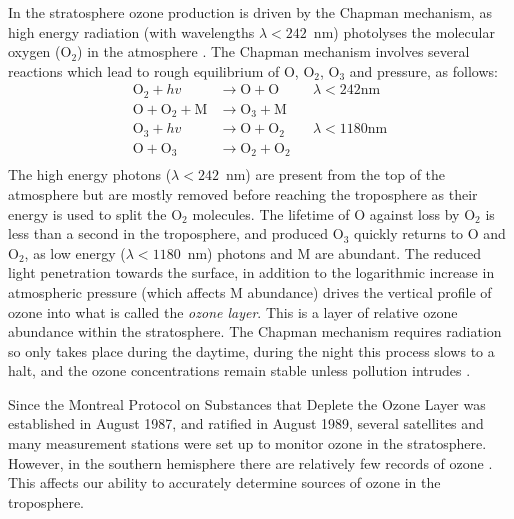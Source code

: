     In the stratosphere ozone production is driven by the Chapman mechanism, as high energy radiation (with wavelengths $\lambda<242$~nm) photolyses the molecular oxygen (O$_2$) in the atmosphere \parencite[][Chapter 3, section 2]{BrasseurJacob2017}.
    The Chapman mechanism involves several reactions which lead to rough equilibrium of O, O$_2$, O$_3$ and pressure, as follows:
    \begin{equation}
      \begin{aligned}
        \text{O}_2 + hv              & \to \text{O}+\text{O}     && \lambda < 242 \text{nm} \\
        \text{O}+\text{O}_2+\text{M} & \to \text{O}_3+\text{M}   &&    \\
        \text{O}_3 + hv              & \to \text{O}+\text{O}_2   && \lambda < 1180 \text{nm} \\
        \text{O} + \text{O}_3        & \to \text{O}_2+\text{O}_2 &&       \\
      \end{aligned}
      \label{LR:O3:eqn_Chapman}
    \end{equation}
    The high energy photons ($\lambda < 242$~nm) are present from the top of the atmosphere but are mostly removed before reaching the troposphere as their energy is used to split the O$_2$ molecules.
    The lifetime of O against loss by O$_2$ is less than a second in the troposphere, and produced O$_3$ quickly returns to O and O$_2$, as low energy ($\lambda < 1180$~nm) photons and M are abundant.
    The reduced light penetration towards the surface, in addition to the logarithmic increase in atmospheric pressure (which affects M abundance) drives the vertical profile of ozone into what is called the \textit{ozone layer}.
    This is a layer of relative ozone abundance within the stratosphere.
    The Chapman mechanism requires radiation so only takes place during the daytime, during the night this process slows to a halt, and the ozone concentrations remain stable unless pollution intrudes \parencite[Chapter 10]{Jacob_1999_book}.
  
    
    Since the Montreal Protocol on Substances that Deplete the Ozone Layer was established in August 1987, and ratified in August 1989, several satellites and many measurement stations were set up to monitor ozone in the stratosphere.
    However, in the southern hemisphere there are relatively few records of ozone \parencite{Huang2017}.
    This affects our ability to accurately determine sources of ozone in the troposphere.
  

